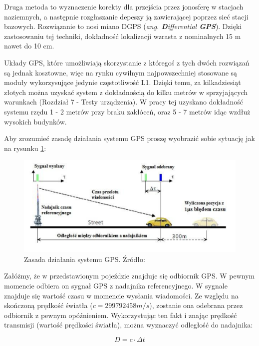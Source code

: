 Druga metoda to wyznaczenie korekty dla przejścia przez jonosferę w stacjach naziemnych, a następnie rozgłaszanie depeszy ją zawierającej poprzez sieć stacji bazowych. Rozwiązanie to nosi miano DGPS (\textit{ang. \textbf{D}ifferential \textbf{GPS}}). Dzięki zastosowaniu tej techniki, dokładność lokalizacji wzrasta z nominalnych 15 m nawet do 10 cm.

Układy GPS, które umożliwiają skorzystanie z któregoś z tych dwóch rozwiązań są jednak kosztowne, więc na rynku cywilnym najpowszechniej stosowane są moduły wykorzysujące jedynie częstotliwość L1. Dzięki temu, za kilkadziesiąt złotych można uzyskać system z dokładnością do kilku metrów w sprzyjających warunkach \cite{inzynierka} (Rozdział 7 - Testy urządzenia). W pracy tej uzyskano dokładność systemu rzędu 1 - 2 metrów przy braku zakłóceń, oraz 5 - 7 metrów idąc wzdłuż wysokich budynków.

Aby zrozumieć zasadę działania systemu GPS proszę wyobrazić sobie sytuację jak na rysunku \ref{fig:image_gps_basics1}:

\begin{figure}[H]
	\centering
	\includegraphics[width=12cm]{img/theory/GPS/gps_basics1.png}
	\caption{Zasada działania systemu GPS. Źródło: \cite{inzynierka}}
	\label{fig:image_gps_basics1}
\end{figure}

Załóżmy, że w przedstawionym pojeździe znajduje się odbiornik GPS. W pewnym momencie odbiera on sygnał GPS z nadajnika referencyjnego. W sygnale znajduje się wartość czasu w momencie wysłania wiadomości. Ze względu na skończoną prędkość światła ($c = 299 792 458 m/s$), zostanie ona odebrana przez odbiornik z pewnym opóźnieniem. Wykorzystując ten fakt i znając prędkość transmisji (wartość prędkości światła), można wyznaczyć odległość do nadajnika:

\begin{equation}
	D = c \cdot \Delta t
\end{equation}

